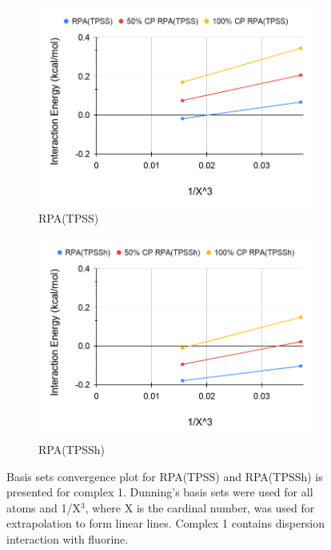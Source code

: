 \documentclass[11pt]{article}
\begin{document}
\begin{figure}[H]
  \centering
  \begin{subfigure}{.5\textwidth}
    \centering
    \includegraphics[scale=0.3]{tpss-1.png}
    \caption{RPA(TPSS)}
    \label{fig:tpss_1}
  \end{subfigure}%
  \begin{subfigure}{.5\textwidth}
    \centering
    \includegraphics[scale=0.3]{tpssh-1.png}
    \caption{RPA(TPSSh)}
    \label{fig:tpssh_1}
  \end{subfigure}
  \caption{Basis sets convergence plot for RPA(TPSS) and RPA(TPSSh) is
    presented for complex 1. Dunning's basis sets were used for all atoms
    and 1/X$^3$, where X is the cardinal number, was used for
    extrapolation to form linear lines. Complex 1 contains dispersion
    interaction with fluorine.}
  \label{fig:complex_1}
\end{figure}
\end{document}
